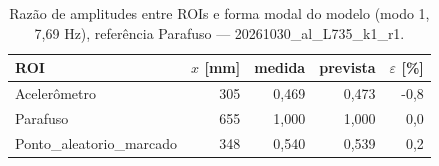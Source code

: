 \begin{table}[htbp]
  \centering
  \caption{Razão de amplitudes entre ROIs e forma modal do modelo (modo 1, 7{,}69 Hz), referência Parafuso — 20261030\_al\_L735\_k1\_r1.}
  \label{tab:forma_modal_20261030_al_L735_k1_r1}
  \begin{tabular}{lrrrr}
    \toprule
    ROI & $x$ [mm] & medida & prevista & $\varepsilon$ [\%] \\
    \midrule
    Acelerômetro & 305 & 0{,}469 & 0{,}473 & -0{,}8 \\
    Parafuso & 655 & 1{,}000 & 1{,}000 & 0{,}0 \\
    Ponto\_aleatorio\_marcado & 348 & 0{,}540 & 0{,}539 & 0{,}2 \\
    \bottomrule
  \end{tabular}
\end{table}
